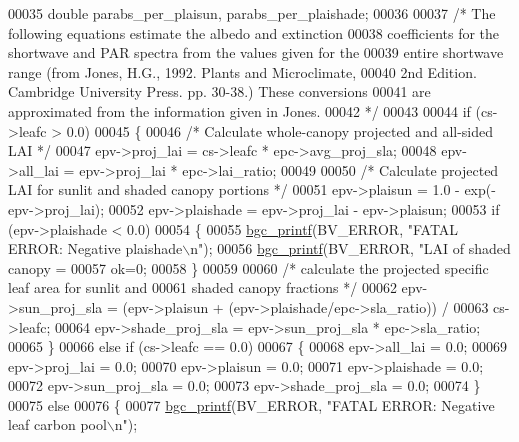 \begin{DoxyCode}
00035     \textcolor{keywordtype}{double} parabs\_per\_plaisun, parabs\_per\_plaishade;
00036     
00037     \textcolor{comment}{/* The following equations estimate the albedo and extinction }
00038 \textcolor{comment}{    coefficients for the shortwave and PAR spectra from the values given for the}
00039 \textcolor{comment}{    entire shortwave range (from Jones, H.G., 1992. Plants and Microclimate,}
00040 \textcolor{comment}{    2nd Edition. Cambridge University Press. pp. 30-38.) These conversions}
00041 \textcolor{comment}{    are approximated from the information given in Jones.}
00042 \textcolor{comment}{    */}
00043     
00044     \textcolor{keywordflow}{if} (cs->leafc > 0.0)
00045     \{
00046         \textcolor{comment}{/* Calculate whole-canopy projected and all-sided LAI */}
00047         epv->proj\_lai = cs->leafc * epc->avg\_proj\_sla;
00048         epv->all\_lai = epv->proj\_lai * epc->lai\_ratio;
00049         
00050         \textcolor{comment}{/* Calculate projected LAI for sunlit and shaded canopy portions */}
00051         epv->plaisun = 1.0 - exp(-epv->proj\_lai);
00052         epv->plaishade = epv->proj\_lai - epv->plaisun;
00053         \textcolor{keywordflow}{if} (epv->plaishade < 0.0)
00054         \{
00055             \hyperlink{bgc__io_8c_af287cce6e2aede1ce337de9319e80d0d}{bgc\_printf}(BV\_ERROR, \textcolor{stringliteral}{"FATAL ERROR: Negative plaishade\(\backslash\)n"});
00056             \hyperlink{bgc__io_8c_af287cce6e2aede1ce337de9319e80d0d}{bgc\_printf}(BV\_ERROR, \textcolor{stringliteral}{"LAI of shaded canopy = %
00057             ok=0;
00058         \}
00059         
00060         \textcolor{comment}{/* calculate the projected specific leaf area for sunlit and }
00061 \textcolor{comment}{        shaded canopy fractions */}
00062         epv->sun\_proj\_sla = (epv->plaisun + (epv->plaishade/epc->sla\_ratio)) /
00063             cs->leafc;
00064         epv->shade\_proj\_sla = epv->sun\_proj\_sla * epc->sla\_ratio;
00065     \}
00066     \textcolor{keywordflow}{else} \textcolor{keywordflow}{if} (cs->leafc == 0.0)
00067     \{
00068         epv->all\_lai = 0.0;
00069         epv->proj\_lai = 0.0;
00070         epv->plaisun = 0.0;
00071         epv->plaishade = 0.0;
00072         epv->sun\_proj\_sla = 0.0;
00073         epv->shade\_proj\_sla = 0.0;
00074     \}
00075     \textcolor{keywordflow}{else}
00076     \{
00077         \hyperlink{bgc__io_8c_af287cce6e2aede1ce337de9319e80d0d}{bgc\_printf}(BV\_ERROR, \textcolor{stringliteral}{"FATAL ERROR: Negative leaf carbon pool\(\backslash\)n"});
}
\end{DoxyCode}
